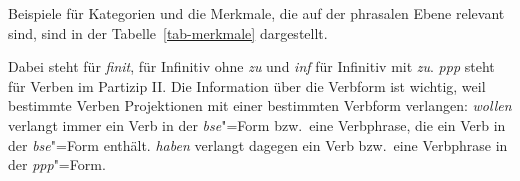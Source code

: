 Beispiele für Kategorien und die Merkmale, die auf der phrasalen Ebene relevant sind, sind
in der Tabelle~\vref{tab-merkmale} dargestellt.
\begin{table}
\caption{\label{tab-merkmale}Beispiele für Hauptkategorien und projizierte Merkmale}
\end{table}
Dabei steht  für \emph{finit},  für Infinitiv ohne \emph{zu}
und \textit{inf} für Infinitiv mit \emph{zu}. \textit{ppp} steht für Verben
im Partizip II. Die Information über die Verbform ist \zb wichtig,
weil bestimmte Verben Projektionen mit einer bestimmten Verbform verlangen:
\eal
\label{bsp-projektion-v-merkmale}
\zl
\emph{wollen} verlangt immer ein Verb in der \emph{bse}"=Form bzw.\ eine Verbphrase, die ein Verb in
der \textit{bse}"=Form enthält. \emph{haben} verlangt dagegen ein Verb bzw.\ eine Verbphrase in der \textit{ppp}"=Form.

